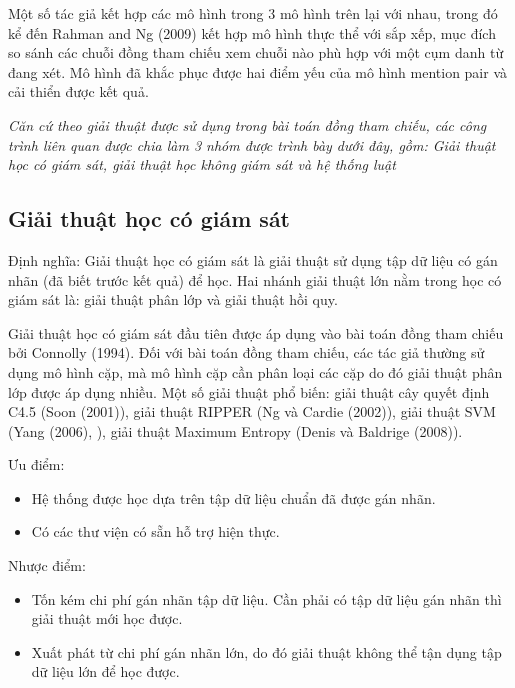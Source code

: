 \documentclass[12pt]{report}
\begin{document}
				\par Một số tác giả kết hợp các mô hình trong 3 mô hình trên lại với nhau, trong đó kể đến Rahman and Ng (2009)\cite{rahman09} kết hợp mô hình thực thể với sắp xếp, mục đích so sánh các chuỗi đồng tham chiếu xem chuỗi nào phù hợp với một cụm danh từ đang xét. Mô hình đã khắc phục được hai điểm yếu của mô hình mention pair và cải thiển được kết quả.
			\par \textit{Căn cứ theo giải thuật được sử dụng trong bài toán đồng tham chiếu, các công trình liên quan được chia làm 3 nhóm được trình bày dưới đây, gồm: Giải thuật học có giám sát, giải thuật học không giám sát và hệ thống luật}
				\subsection*{Giải thuật học có giám sát}
					\par Định nghĩa: Giải thuật học có giám sát là giải thuật sử dụng tập dữ liệu có gán nhãn (đã biết trước kết quả) để học. Hai nhánh giải thuật lớn nằm trong học có giám sát là: giải thuật phân lớp và giải thuật hồi quy.
					\par Giải thuật học có giám sát đầu tiên được áp dụng vào bài toán đồng tham chiếu bởi Connolly (1994)\cite{connolly95}. Đối với bài toán đồng tham chiếu, các tác giả thường sử dụng mô hình cặp, mà mô hình cặp cần phân loại các cặp do đó giải thuật phân lớp được áp dụng nhiều. Một số giải thuật phổ biến: giải thuật cây quyết định C4.5 (Soon (2001)\cite{soon01}), giải thuật RIPPER (Ng và Cardie (2002)\cite{ng02}), giải thuật SVM (Yang (2006)\cite{yang06}, ), giải thuật Maximum Entropy (Denis và Baldrige (2008)\cite{denis08}).
					\par Ưu điểm:
					\begin{itemize}
						\item{Hệ thống được học dựa trên tập dữ liệu chuẩn đã được gán nhãn.}
						\item{Có các thư viện có sẵn hỗ trợ hiện thực.}
					\end{itemize}
					\par Nhược điểm:
					\begin{itemize}
						\item{Tốn kém chi phí gán nhãn tập dữ liệu. Cần phải có tập dữ liệu gán nhãn thì giải thuật mới học được.}
						\item{Xuất phát từ chi phí gán nhãn lớn, do đó giải thuật không thể tận dụng tập dữ liệu lớn để học được.}
					\end{itemize}
\end{document}
